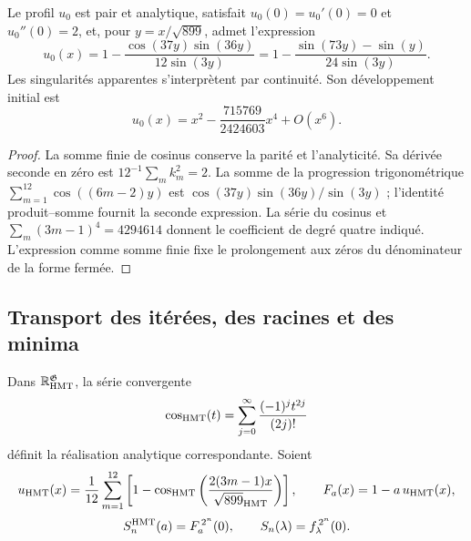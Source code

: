 \begin{proposition}
\label{hmtfg:forma-perfil}
Le profil \(u_0\) est pair et analytique, satisfait
\(u_0(0)=u_0'(0)=0\) et \(u_0''(0)=2\), et, pour
\(y=x/\sqrt{899}\), admet l’expression
\[
 u_0(x)=1-\frac{\cos(37y)\sin(36y)}{12\sin(3y)}
       =1-\frac{\sin(73y)-\sin(y)}{24\sin(3y)}.
\]
Les singularités apparentes s’interprètent par continuité. Son développement initial est
\[
 u_0(x)=x^2-\frac{715769}{2424603}x^4+O(x^6).
\]
\end{proposition}
\begin{proof}
La somme finie de cosinus conserve la parité et l’analyticité. Sa dérivée seconde en zéro est \(12^{-1}\sum_m k_m^2=2\). La somme de la progression trigonométrique \(\sum_{m=1}^{12}\cos((6m-2)y)\) est \(\cos(37y)\sin(36y)/\sin(3y)\) ; l’identité produit--somme fournit la seconde expression. La série du cosinus et \(\sum_m(3m-1)^4=4294614\) donnent le coefficient de degré quatre indiqué. L’expression comme somme finie fixe le prolongement aux zéros du dénominateur de la forme fermée.
\end{proof}

\subsection{Transport des itérées, des racines et des minima}
\label{hmtfg:transporte-raices}

Dans \(\mathbb R_{\rm HMT}^{\mathfrak G}\), la série convergente
\[
 \cos_{\rm HMT}(t)=\sum_{j=0}^{\infty}
                   \frac{(-1)^j t^{2j}}{(2j)!}
\]
définit la réalisation analytique correspondante. Soient
\[
 u_{\rm HMT}(x)=\frac1{12}\sum_{m=1}^{12}
  \left[1-\cos_{\rm HMT}
   \left(\frac{2(3m-1)x}{\sqrt{899}_{\rm HMT}}\right)\right],
 \qquad F_a(x)=1-a\,u_{\rm HMT}(x),
\]
\[
 S_n^{\rm HMT}(a)=F_a^{\,2^n}(0),\qquad
 S_n(\lambda)=f_\lambda^{\,2^n}(0).
\]

